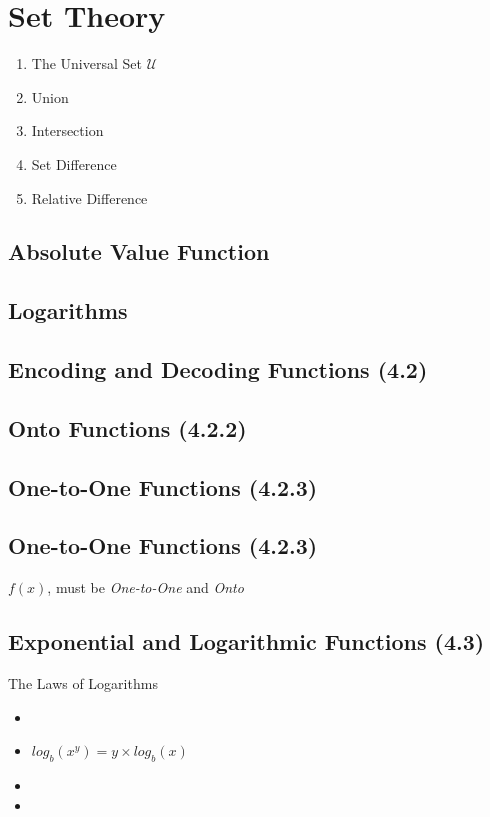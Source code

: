\documentclass{article}
\begin{document}
\section{Set Theory}
\begin{enumerate}
\item The Universal Set $\mathcal{U}$
\item Union
\item Intersection
\item Set Difference
\item Relative Difference
\end{enumerate}

\newpage
\subsection*{Absolute Value Function}


\subsection*{Logarithms}



\subsection*{Encoding and Decoding Functions (4.2)}


\subsection*{Onto Functions (4.2.2)}

\subsection*{One-to-One Functions (4.2.3)}


\subsection*{One-to-One Functions (4.2.3)}
$f(x)$, must be \emph{One-to-One} and \emph{Onto}



\subsection*{Exponential and Logarithmic Functions (4.3)}

The Laws of Logarithms
\begin{itemize}
\item
\item $log_b(x^y) = y \times log_b(x)$
\item
\item
\end{itemize}
\end{document}
